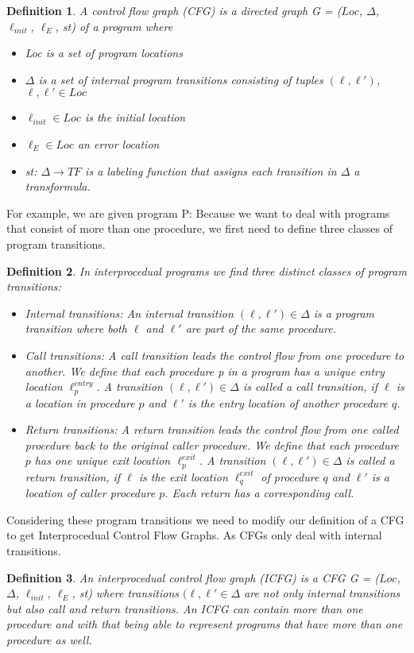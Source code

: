 \documentclass{article}
\newtheorem{mydef}{Definition}
\newcommand\mycom[1]{}
\newcommand\mycom[1]{#1}
\newcommand{\jw}[1]{\mycom{\todo[color=blue!40,inline]{\small JW: #1}}}
\begin{document}
	\begin{mydef}
		A control flow graph (CFG) is a directed graph G = ($Loc$, $\Delta$, $\ell_{init}$, $\ell_E$, st) of a program where
		\begin{itemize}
			\item  Loc is a set of program locations
			\item $\Delta$ is a set of internal program transitions consisting of tuples $(\ell, \ell')$, $\ell, \ell' \in Loc$
			\item $\ell_{init} \in Loc$ is the initial location
			\item $\ell_E \in Loc$ an error location
			\item st: $\Delta \rightarrow TF$ is a labeling function that assigns each transition in $\Delta$ a transformula.
		\end{itemize}
	\end{mydef} \noindent
	For example, we are given program P: \jw{\textbf{ToDo example}}
	\bigskip\bigskip\bigskip\noindent
	Because we want to deal with programs that consist of more than one procedure, we first need to define three classes of program transitions.
	
	\begin{mydef} In interprocedual programs we find three distinct classes of program transitions:
		\begin{itemize}
			\item Internal transitions: An internal transition $(\ell, \ell') \in \Delta$ is a program transition where both $\ell$ and $\ell'$ are part of the same procedure. 
			
			\item Call transitions:  A call transition leads the control flow from one procedure to another. We define that each procedure p in a program has a unique entry location $\ell^{entry}_p$. A transition $(\ell, \ell') \in \Delta$ is called a call transition, if $\ell$ is a location in procedure $p$ and $\ell'$ is the entry location of another procedure $q$.
			
			\item Return transitions: A return transition leads the control flow from one called procedure back to the original caller procedure. We define that each procedure $p$ has one unique exit location $\ell^{exit}_p$. A transition $(\ell, \ell') \in \Delta$ is called a return transition, if $\ell$ is the exit location $\ell_q^{exit}$ of procedure $q$ and $\ell'$ is a location of caller procedure $p$. Each return has a corresponding call.
		\end{itemize}
	\end{mydef}
	 \bigskip\noindent
	Considering these program transitions we need to modify our definition of a CFG to get Interprocedual Control Flow Graphs. As CFGs only deal with internal transitions.
	\begin{mydef}
		An interprocedual control flow graph (ICFG) is a CFG G = ($Loc$, $\Delta$, $\ell_{init}$, $\ell_E$, st) where transitions $(\ell, \ell' \in \Delta$ are not only internal transitions but also call and return transitions. An ICFG can contain more than one procedure and with that being able to represent programs that have more than one procedure as well.
	\end{mydef}
	
\end{document}
